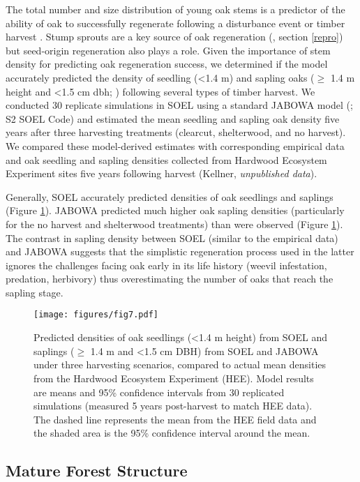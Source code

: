 \documentclass[
11pt, %
a4paper, %
oneside, %
headinclude,footinclude, %
]{scrartcl}
\begin{document}
The total number and size distribution of young oak stems is a predictor of the ability of oak to successfully regenerate following a disturbance event or timber harvest \citep{Johnson2009}. Stump sprouts are a key source of oak regeneration (\citep{Johnson2009}, section \ref{repro}) but seed-origin regeneration also plays a role. Given the importance of stem density for predicting oak regeneration success, we determined if the model accurately predicted the density of seedling (\textless 1.4 m) and sapling oaks ($\geq$ 1.4 m height and \textless 1.5 cm dbh; \citep{Saunders2013}) following several types of timber harvest. We conducted 30 replicate simulations in SOEL using a standard JABOWA model (\citep{Botkin1993}; S2 SOEL Code) and estimated the mean seedling and sapling oak density five years after three harvesting treatments (clearcut, shelterwood, and no harvest). We compared these model-derived estimates with corresponding empirical data and oak seedling and sapling densities collected from Hardwood Ecosystem Experiment sites five years following harvest (Kellner, \textit{unpublished data}). 

Generally, SOEL accurately predicted densities of oak seedlings and saplings (Figure \ref{fig:7}). JABOWA predicted much higher oak sapling densities (particularly for the no harvest and shelterwood treatments) than were observed (Figure \ref{fig:7}). The contrast in sapling density between SOEL (similar to the empirical data) and JABOWA suggests that the simplistic regeneration process used in the latter ignores the challenges facing oak early in its life history (weevil infestation, predation, herbivory) thus overestimating the number of oaks that reach the sapling stage.

\begin{figure}
	\centering
	\texttt{[image: figures/fig7.pdf]}
	\caption{Predicted densities of oak seedlings (\textless 1.4 m height) from SOEL and saplings ($\geq$ 1.4 m and \textless 1.5 cm DBH) from SOEL and JABOWA under three harvesting scenarios, compared to actual mean densities from the Hardwood Ecosystem Experiment (HEE). Model results are means and 95\% confidence intervals from 30 replicated simulations (measured 5 years post-harvest to match HEE data). The dashed line represents the mean from the HEE field data and the shaded area is the 95\% confidence interval around the mean.}
	\label{fig:7}
\end{figure}

\subsection{Mature Forest Structure}
\end{document}
